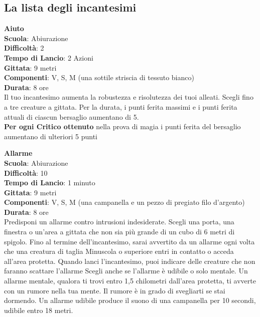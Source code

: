 \pagebreak

\begin{multicols}{2}

\subsection{La lista degli incantesimi}

\medskip\textbf{Aiuto}\\
\textbf{Scuola}: Abiurazione\\
\textbf{Difficoltà}: 2\\
\textbf{Tempo di Lancio}: 2 Azioni\\
\textbf{Gittata}: 9 metri\\
\textbf{Componenti}: V, S, M (una sottile striscia di tessuto bianco)\\
\textbf{Durata}: 8 ore\\
Il tuo incantesimo aumenta la robustezza e risolutezza dei tuoi alleati. Scegli fino a tre creature a gittata. Per la durata, i punti ferita massimi e i punti ferita attuali di ciascun bersaglio aumentano di 5.\\
\textbf{Per ogni Critico ottenuto} nella prova di magia i punti ferita del bersaglio aumentano di ulteriori 5 punti

\medskip\textbf{Allarme}\\
\textbf{Scuola}: Abiurazione\\
\textbf{Difficoltà}: 10\\
\textbf{Tempo di Lancio}: 1 minuto\\
\textbf{Gittata}: 9 metri\\
\textbf{Componenti}: V, S, M (una campanella e un pezzo di pregiato filo d'argento)\\
\textbf{Durata}: 8 ore\\
Predisponi un allarme contro intrusioni indesiderate. Scegli una porta, una finestra o un'area a gittata che non sia più grande di un cubo di 6 metri di spigolo. Fino al termine dell'incantesimo, sarai avvertito da un allarme ogni volta che una creatura di taglia Minuscola o superiore entri in contatto o acceda all'area protetta. Quando lanci l'incantesimo, puoi indicare delle creature che non faranno scattare l'allarme Scegli anche se l'allarme è udibile o solo mentale. Un allarme mentale, qualora ti trovi entro 1,5 chilometri dall'area protetta, ti avverte con un rumore nella tua mente. Il rumore è in grado di svegliarti se stai dormendo. Un allarme udibile produce il suono di una campanella per 10 secondi, udibile entro 18 metri.


\end{multicols}
